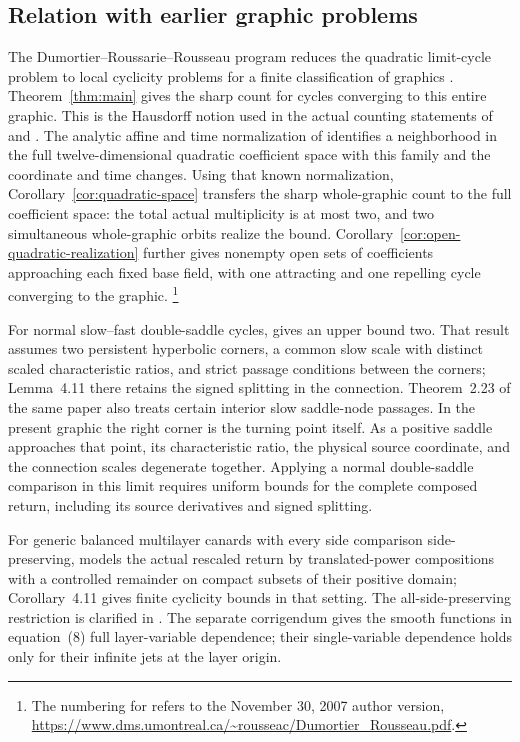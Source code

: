 \subsection{Relation with earlier graphic problems}
The Dumortier--Roussarie--Rousseau program reduces the quadratic
limit-cycle problem to local cyclicity problems for a finite
classification of graphics \cite{DRR1994}. Theorem~\ref{thm:main} gives the sharp count for
cycles converging to this entire graphic. This is the Hausdorff notion
used in the actual counting
statements of \cite[Theorem~3.1]{DR2009} and
\cite[Theorems~1.1--1.2]{Huzak2018}.
The analytic affine and time normalization of
\cite[Proposition~2.1]{DR2009} identifies a neighborhood in the full
twelve-dimensional quadratic coefficient space with this family and
the coordinate and time changes. Using that known normalization,
Corollary~\ref{cor:quadratic-space} transfers the sharp whole-graphic
count to the full coefficient space: the total actual multiplicity is
at most two, and two simultaneous whole-graphic orbits realize the
bound. Corollary~\ref{cor:open-quadratic-realization} further gives
nonempty open sets of coefficients approaching each fixed base field,
with one attracting and one repelling cycle converging to the graphic.
\footnote{The numbering for
\cite{DR2009} refers to the November 30, 2007 author version,
\url{https://www.dms.umontreal.ca/~rousseac/Dumortier_Rousseau.pdf}.}

For normal slow--fast double-saddle cycles,
\cite[Theorem~2.25(ii)]{DMD2008Singular} gives an upper bound two. That result assumes
two persistent hyperbolic corners, a common slow scale with distinct
scaled characteristic ratios, and strict passage conditions between
the corners; Lemma~4.11 there retains the
signed splitting in the connection. Theorem~2.23 of the same paper
also treats certain interior slow saddle-node passages. In the present graphic the
right corner is the turning point itself. As a positive saddle
approaches that point, its characteristic ratio, the physical source
coordinate, and the connection scales degenerate together. Applying
a normal double-saddle comparison in this limit requires uniform
bounds for the complete composed return, including its source
derivatives and signed splitting.

For generic balanced multilayer canards with every side comparison
side-preserving,
\cite[Theorem~4.10, pp.~1346--1347]{DR2008Multilayer} models the actual
rescaled return by translated-power compositions with a controlled
remainder on compact subsets of their positive domain; Corollary~4.11
gives finite cyclicity bounds in that setting. The all-side-preserving
restriction is clarified in \cite{DMD2023SideComparison}.
The separate corrigendum
\cite[p.~1995]{DR2008Corrigendum} gives the smooth functions in equation~(8)
full layer-variable dependence; their single-variable dependence holds
only for their infinite jets at the layer origin.

